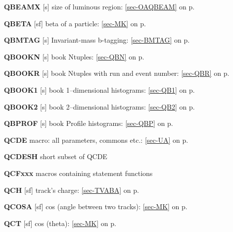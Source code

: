  
 \item{\bf QBEAMX }[s] size of luminous region: \ref{sec-OAQBEAM} on p.~\pageref{sec-OAQBEAM}\\
 \item{\bf QBETA   }[sf] beta of a particle: \ref{sec-MK} on p.~\pageref{sec-MK}\\
 \item{\bf QBMTAG  }[s] Invariant-mass b-tagging: \ref{sec-BMTAG} on p.~\pageref{sec-BMTAG}\\
 \item{\bf QBOOKN  }[s] book Ntuples: \ref{sec-QBN} on p.~\pageref{sec-QBN}\\
 \item{\bf QBOOKR  }[s] book Ntuples with run and event number:
 \ref{sec-QBR} on p.~\pageref{sec-QBR}\\
 \item{\bf QBOOK1  }[s] book 1--dimensional histograms: \ref{sec-QB1} on p.~\pageref{sec-QB1}\\
 \item{\bf QBOOK2  }[s] book 2--dimensional histograms: \ref{sec-QB2} on p.~\pageref{sec-QB2}\\
 \item{\bf QBPROF  }[s] book Profile histograms: \ref{sec-QBP} on p.~\pageref{sec-QBP}\\
 \item{\bf QCDE    }macro: all parameters, commons etc.: \ref{sec-UA} on p.~\pageref{sec-UA}\\
 \item{\bf QCDESH  }short subset of QCDE\\
 \item{\bf QCFxxx  }macros containing statement functions\\
 \item{\bf QCH     }[sf] track's charge: \ref{sec-TVABA} on p.~\pageref{sec-TVABA}\\
 \item{\bf QCOSA   }[sf] cos (angle between two tracks):
 \ref{sec-MK} on p.~\pageref{sec-MK}\\
 \item{\bf QCT     }[sf] cos (theta): \ref{sec-MK} on p.~\pageref{sec-MK}
 
